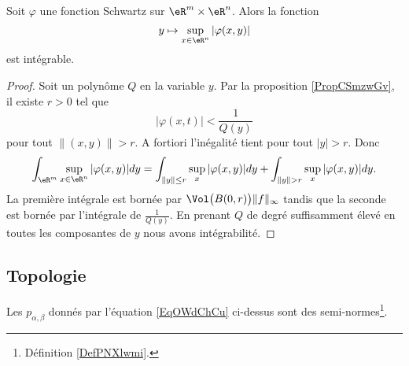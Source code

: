 \begin{corollary}        \label{CORooZFPSooHCFUSH}
    Soit \( \varphi\) une fonction Schwartz sur \( \eR^m\times \eR^n\). Alors la fonction
    \begin{equation}
        y\mapsto \sup_{x\in \eR^n}| \varphi(x,y) |
    \end{equation}
    est intégrable.
\end{corollary}

\begin{proof}
    Soit un polynôme \( Q\) en la variable \( y\). Par la proposition \ref{PropCSmzwGv}, il existe \( r>0\) tel que
    \begin{equation}
        | \varphi(x,t) |<\frac{1}{ Q(y) }
    \end{equation}
    pour tout \( \| (x,y) \|>r\). A fortiori l'inégalité tient pour tout \( | y |>r\). Donc
    \begin{equation}
        \int_{\eR^m}\sup_{x\in \eR^n}| \varphi(x,y) |dy=\int_{\| y \|\leq r}\sup_{x}| \varphi(x,y) |dy+\int_{ \| y \|>r  }\sup_{x}| \varphi(x,y) |dy.
    \end{equation}
    La première intégrale est bornée par \( \Vol\big( B(0,r) \big)\| f \|_{\infty}\) tandis que la seconde est bornée par l'intégrale de \( \frac{1}{ Q(y) }\). En prenant \( Q\) de degré suffisamment élevé en toutes les composantes de \( y\) nous avons intégrabilité.
\end{proof}

\subsection{Topologie}

\begin{lemma}
    Les \( p_{\alpha,\beta}\) donnés par l'équation \eqref{EqOWdChCu} ci-dessus sont des semi-normes\footnote{Définition \ref{DefPNXlwmi}.}.
\end{lemma}


